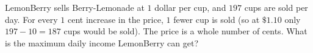 LemonBerry sells Berry-Lemonade at $1$ dollar per cup, and $197$ cups are sold per day. For every $1$ cent increase in the price, $1$ fewer cup is sold (so at $\$1.10$ only $197-10=187$ cups would be sold). The price is a whole number of cents. What is the maximum daily income LemonBerry can get?
